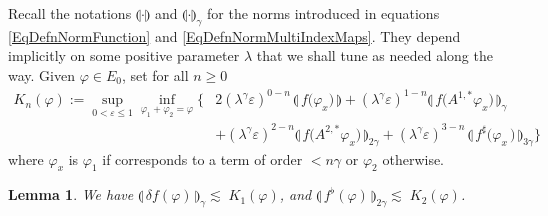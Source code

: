 \documentclass[11pt,a4paper]{amsart}
\renewcommand{\leq}{\leqslant}
\newcommand{\ssk}{\smallskip}
\newtheorem{lem}[thm]{\hspace{-0.15cm}  {\sc Lemma} }%
\numberwithin{equation}{section} %
\begin{document}
Recall the notations $\llparenthesis \cdot\rrparenthesis$ and $\llparenthesis \cdot\rrparenthesis_\gamma$ for the norms introduced in equations \eqref{EqDefnNormFunction} and \eqref{EqDefnNormMultiIndexMaps}. They depend implicitly on some positive parameter $\lambda$ that we shall tune as needed along the way. Given $\varphi\in E_0$, set for all $n\ge 0$
\begin{equation*}
\begin{split}
K_n(\varphi) := \sup_{0 < \varepsilon \leq 1} \inf_{\varphi_1+\varphi_2=\varphi} \Big\{&   2
 (\lambda^\gamma \varepsilon)^{0-n} \, \llparenthesis\, f\big(\varphi_x\big) \,\rrparenthesis
  +  (\lambda^\gamma \varepsilon)^{1-n} \llparenthesis\, f\big(A^{1,*}\varphi_x \big) \,\rrparenthesis_\gamma  
 \\ &
 + (\lambda^\gamma \varepsilon)^{2-n}\llparenthesis\, f\big(A^{2,*} \varphi_x) \,\rrparenthesis_{2\gamma} 
  +  (\lambda^\gamma \varepsilon)^{3-n}\,\llparenthesis\, f^\sharp \big(  \varphi_x \,) \,\rrparenthesis_{3\gamma} 
  \Big\}
\end{split}
\end{equation*}
where $\varphi_x$ is $\varphi_1$ if corresponds to a term of order $<n\gamma$ or $\varphi_2$ otherwise. 
\ssk

\begin{lem}
\label{LemmaGeneralImproveEstimates}
We have $\llparenthesis\, \delta f(\varphi) \,\rrparenthesis_\gamma \lesssim\; K_1(\varphi)$, and $\llparenthesis\,  f^\flat(\varphi) \,\rrparenthesis_{2\gamma} \lesssim\; K_2(\varphi)$.
\end{lem}

\medskip
\end{document}
